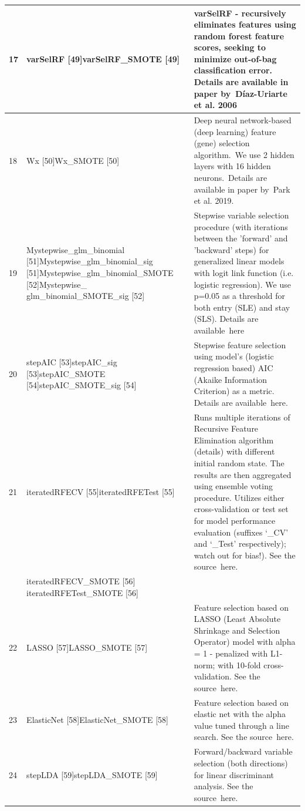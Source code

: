 \documentclass[article]{jss}
\begin{document}
\begin{tabular}{|p{0.2in}|p{2.0in}|p{3.9in}|}
17 & varSelRF [49]varSelRF\_SMOTE [49] & varSelRF - recursively eliminates features using random forest feature scores, seeking to minimize out-of-bag classification error. Details are available in paper by~D\'{i}az-Uriarte et al. 2006\underbar{.} \\ \hline
18 & Wx [50]Wx\_SMOTE [50] & Deep neural network-based (deep learning) feature (gene) selection algorithm.~We use 2 hidden layers with 16 hidden neurons.~Details are available in paper by~Park et al. 2019.  \\ \hline
19 & Mystepwise\_glm\_binomial [51]\newline Mystepwise\_glm\_binomial\_sig [51]\newline Mystepwise\_glm\_binomial\_SMOTE [52]\newline Mystepwise\_ glm\_binomial\_SMOTE\_sig [52] & Stepwise variable selection procedure (with iterations between the 'forward' and 'backward' steps) for generalized linear models with logit link function (i.e. logistic regression). We use p=0.05 as a threshold for both entry (SLE) and stay (SLS). Details are available~here\underbar{.} \\ \hline
20 & stepAIC [53]stepAIC\_sig [53]\newline stepAIC\_SMOTE [54]\newline stepAIC\_SMOTE\_sig [54] & Stepwise feature selection using model's (logistic regression based) AIC (Akaike Information Criterion) as a metric. Details are available~here. \\ \hline
21 & iteratedRFECV [55]iteratedRFETest [55] & Runs multiple iterations of Recursive Feature Elimination algorithm (details) with different initial random state. The results are then aggregated using ensemble voting procedure. Utilizes either cross-validation or test set for model performance evaluation (suffixes `\_CV' and `\_Test' respectively); watch out for bias!). See the source~here. \\ \hline
 & iteratedRFECV\_SMOTE [56] iteratedRFETest\_SMOTE [56] &  \\ \hline
22 & LASSO [57]LASSO\_SMOTE [57] & Feature selection based on LASSO (Least Absolute Shrinkage and Selection Operator) model with alpha = 1 - penalized with L1-norm; with 10-fold cross-validation. See the source~here.  \\ \hline
23 & ElasticNet [58]ElasticNet\_SMOTE [58] & Feature selection based on elastic net with the alpha value tuned through a line search. See the source~here.  \\ \hline
24 & stepLDA [59]\newline stepLDA\_SMOTE [59] & Forward/backward variable selection (both directions) for linear discriminant analysis. See the source~here. \\ \hline

\end{tabular}
\end{document}
